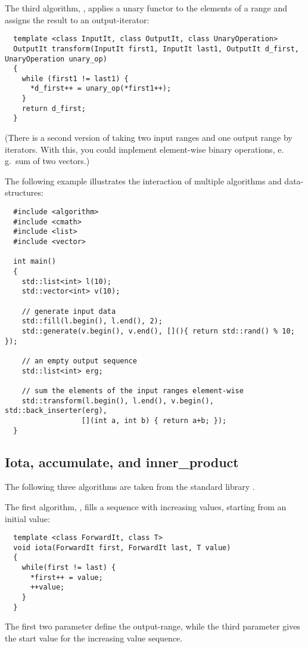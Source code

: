 The third algorithm, , applies a unary functor to the elements of a range and assigns the result to an output-iterator:
%
\begin{samepage}
\begin{verbatim}
  template <class InputIt, class OutputIt, class UnaryOperation>
  OutputIt transform(InputIt first1, InputIt last1, OutputIt d_first, UnaryOperation unary_op)
  {
    while (first1 != last1) {
      *d_first++ = unary_op(*first1++);
    }
    return d_first;
  }
\end{verbatim}
\end{samepage}
(There is a second version of  taking two input ranges and one output range by iterators. With this, you could implement element-wise
binary operations, e.\,g.\ sum of two vectors.)

\begin{example}
  The following example illustrates the interaction of multiple algorithms and data-structures:
  \begin{verbatim}
  #include <algorithm>
  #include <cmath>
  #include <list>
  #include <vector>

  int main()
  {
    std::list<int> l(10);
    std::vector<int> v(10);

    // generate input data
    std::fill(l.begin(), l.end(), 2);
    std::generate(v.begin(), v.end(), [](){ return std::rand() % 10; });

    // an empty output sequence
    std::list<int> erg;

    // sum the elements of the input ranges element-wise
    std::transform(l.begin(), l.end(), v.begin(), std::back_inserter(erg),
                  [](int a, int b) { return a+b; });
  }
  \end{verbatim}
\end{example}


\subsection{Iota, accumulate, and inner\_product}
The following three algorithms are taken from the standard library .

The first algorithm, , fills a sequence with increasing values, starting from an initial value:
%
\begin{samepage}
\begin{verbatim}
  template <class ForwardIt, class T>
  void iota(ForwardIt first, ForwardIt last, T value)
  {
    while(first != last) {
      *first++ = value;
      ++value;
    }
  }
\end{verbatim}
\end{samepage}
%
The first two parameter define the output-range, while the third parameter gives the start value for the increasing value sequence.

